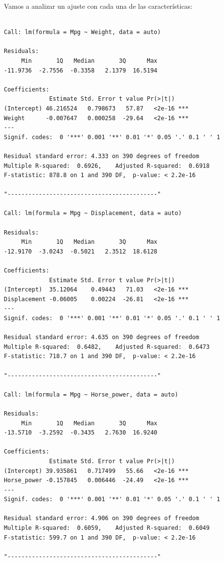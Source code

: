 Vamos a analizar un ajuste con cada una de las características:

\begin{verbatim}

Call: lm(formula = Mpg ~ Weight, data = auto)

Residuals:
     Min       1Q   Median       3Q      Max 
-11.9736  -2.7556  -0.3358   2.1379  16.5194 

Coefficients:
             Estimate Std. Error t value Pr(>|t|)    
(Intercept) 46.216524   0.798673   57.87   <2e-16 ***
Weight      -0.007647   0.000258  -29.64   <2e-16 ***
---
Signif. codes:  0 '***' 0.001 '**' 0.01 '*' 0.05 '.' 0.1 ' ' 1

Residual standard error: 4.333 on 390 degrees of freedom
Multiple R-squared:  0.6926,    Adjusted R-squared:  0.6918 
F-statistic: 878.8 on 1 and 390 DF,  p-value: < 2.2e-16

"-------------------------------------------"

Call: lm(formula = Mpg ~ Displacement, data = auto)

Residuals:
     Min       1Q   Median       3Q      Max 
-12.9170  -3.0243  -0.5021   2.3512  18.6128 

Coefficients:
             Estimate Std. Error t value Pr(>|t|)    
(Intercept)  35.12064    0.49443   71.03   <2e-16 ***
Displacement -0.06005    0.00224  -26.81   <2e-16 ***
---
Signif. codes:  0 '***' 0.001 '**' 0.01 '*' 0.05 '.' 0.1 ' ' 1

Residual standard error: 4.635 on 390 degrees of freedom
Multiple R-squared:  0.6482,    Adjusted R-squared:  0.6473 
F-statistic: 718.7 on 1 and 390 DF,  p-value: < 2.2e-16

"-------------------------------------------"

Call: lm(formula = Mpg ~ Horse_power, data = auto)

Residuals:
     Min       1Q   Median       3Q      Max 
-13.5710  -3.2592  -0.3435   2.7630  16.9240 

Coefficients:
             Estimate Std. Error t value Pr(>|t|)    
(Intercept) 39.935861   0.717499   55.66   <2e-16 ***
Horse_power -0.157845   0.006446  -24.49   <2e-16 ***
---
Signif. codes:  0 '***' 0.001 '**' 0.01 '*' 0.05 '.' 0.1 ' ' 1

Residual standard error: 4.906 on 390 degrees of freedom
Multiple R-squared:  0.6059,    Adjusted R-squared:  0.6049 
F-statistic: 599.7 on 1 and 390 DF,  p-value: < 2.2e-16

"-------------------------------------------"


\end{verbatim}
